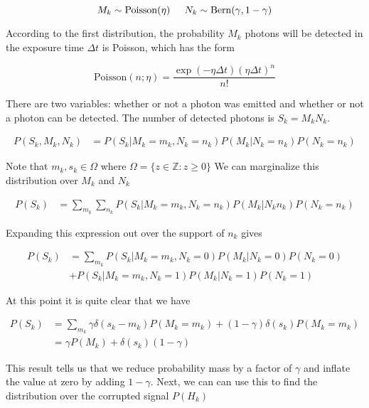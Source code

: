 \documentclass{article}
\begin{document}
\begin{equation*}
M_{k} \sim \mathrm{Poisson}(\eta)\hspace{0.2in}N_{k} \sim \mathrm{Bern}(\gamma, 1-\gamma)
\end{equation*}

According to the first distribution, the probability $M_{k}$ photons will be detected in the exposure time $\Delta t$ is Poisson, which has the form 

\begin{equation*}
\mathrm{Poisson}(n; \eta) = \frac{\exp\left({-\eta\Delta t}\right)(\eta\Delta t)^{n}}{n!}
\end{equation*}

There are two variables: whether or not a photon was emitted and whether or not a photon can be detected. The number of detected photons is $S_{k} = M_{k}N_{k}$.

\begin{align*}
P(S_{k},M_{k},N_{k}) &= P(S_{k}|M_{k}=m_{k},N_{k}=n_{k})P(M_{k}|N_{k}=n_{k})P(N_{k}=n_{k})
\end{align*}

Note that $m_{k},s_{k} \in \Omega$ where $\Omega = \{z \in \mathbb{Z}: z \geq 0\}$ We can marginalize this distribution over $M_{k}$ and $N_{k}$

\begin{align*}
P(S_{k})  &= \sum_{m_{k}}\sum_{n_{k}} P(S_{k}|M_{k}=m_{k},N_{k}=n_{k})P(M_{k}|N_{k}n_{k})P(N_{k}=n_{k})
\end{align*}

Expanding this expression out over the support of $n_{k}$ gives

\begin{align*}
P(S_{k}) &= \sum_{m_{k}}P(S_{k}|M_{k}=m_{k},N_{k}=0)P(M_{k}|N_{k}=0)P(N_{k}=0)\\
&+ P(S_{k}|M_{k}=m_{k},N_{k}=1)P(M_{k}|N_{k}=1)P(N_{k}=1)
\end{align*}

At this point it is quite clear that we have

\begin{align*}
P(S_{k}) &= \sum_{m_{k}}\gamma\delta(s_{k}-m_{k})P(M_{k}=m_{k})+(1-\gamma)\delta(s_{k}) P(M_{k}=m_{k})\\
&= \gamma P(M_{k}) + \delta(s_{k})(1-\gamma)
\end{align*}

This result tells us that we reduce probability mass by a factor of $\gamma$ and inflate the value at zero by adding $1-\gamma$. Next, we can can use this to find the distribution over the corrupted signal $P(H_{k})$
\end{document}
